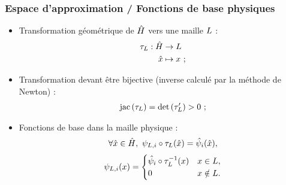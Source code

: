 \begin{frame}
\frametitle{Espace d'approximation / Fonctions de base physiques}
\vfill
\begin{itemize}
\item Transformation géométrique de $\hat{H}$ vers une maille $L$ :
\begin{align*}
	\tau_{L} : \hat{H} &\to L \\
	\hat{x} &\mapsto x \ ;
\end{align*}
\vfill
\item Transformation devant être bijective (inverse calculé par la méthode de Newton) :
\begin{align*}
	\mathrm{jac}\left(\tau_{L}\right) = \det\left(\tau_{L}'\right) > 0 \ ;
\end{align*}
\vfill
\item Fonctions de base dans la maille physique :
\begin{align*}
	\forall \hat{x} \in \hat{H}, \
	\psi_{L,i} \circ \tau_{L}(\hat{x}) =
	\hat{\psi}_{i}(\hat{x}) ,
\end{align*}
\begin{align*}
	\psi_{L,i}(x) =
	\begin{cases}
		\hat{\psi}_{i} \circ \tau_{L}^{-1}(x) & x \in L , \\
		0 & x \notin L .
	\end{cases}
\end{align*}
\end{itemize}
\vfill
\end{frame}


